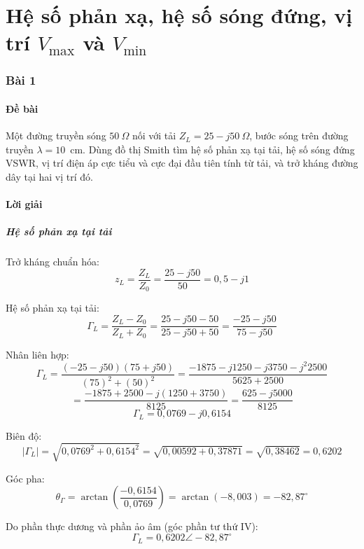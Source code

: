 \documentclass[12pt,a4paper]{article}
\begin{document}
\part{Hệ số phản xạ, hệ số sóng đứng, vị trí $V_{\max}$ và $V_{\min}$}

\section{Bài 1}

\subsection{Đề bài}
Một đường truyền sóng $50~\Omega$ nối với tải $Z_L = 25 - j50~\Omega$, bước sóng trên đường truyền $\lambda = 10$~cm. Dùng đồ thị Smith tìm hệ số phản xạ tại tải, hệ số sóng đứng VSWR, vị trí điện áp cực tiểu và cực đại đầu tiên tính từ tải, và trở kháng đường dây tại hai vị trí đó.

\subsection{Lời giải}

\subsubsection{Hệ số phản xạ tại tải}

Trở kháng chuẩn hóa:
\[
z_L = \frac{Z_L}{Z_0} = \frac{25 - j50}{50} = 0{,}5 - j1
\]

Hệ số phản xạ tại tải:
\[
\Gamma_L = \frac{Z_L - Z_0}{Z_L + Z_0} = \frac{25 - j50 - 50}{25 - j50 + 50} = \frac{-25 - j50}{75 - j50}
\]

Nhân liên hợp:
\[
\Gamma_L = \frac{(-25 - j50)(75 + j50)}{(75)^2 + (50)^2} = \frac{-1875 - j1250 - j3750 - j^2 2500}{5625 + 2500}
\]
\[
= \frac{-1875 + 2500 - j(1250 + 3750)}{8125} = \frac{625 - j5000}{8125}
\]
\[
\Gamma_L = 0{,}0769 - j0{,}6154
\]

Biên độ:
\[
|\Gamma_L| = \sqrt{0{,}0769^2 + 0{,}6154^2} = \sqrt{0{,}00592 + 0{,}37871} = \sqrt{0{,}38462} = 0{,}6202
\]

Góc pha:
\[
\theta_\Gamma = \arctan\left(\frac{-0{,}6154}{0{,}0769}\right) = \arctan(-8{,}003) = -82{,}87^\circ
\]

Do phần thực dương và phần ảo âm (góc phần tư thứ IV):
\[
\boxed{\Gamma_L = 0{,}6202 \angle -82{,}87^\circ}
\]
\end{document}
